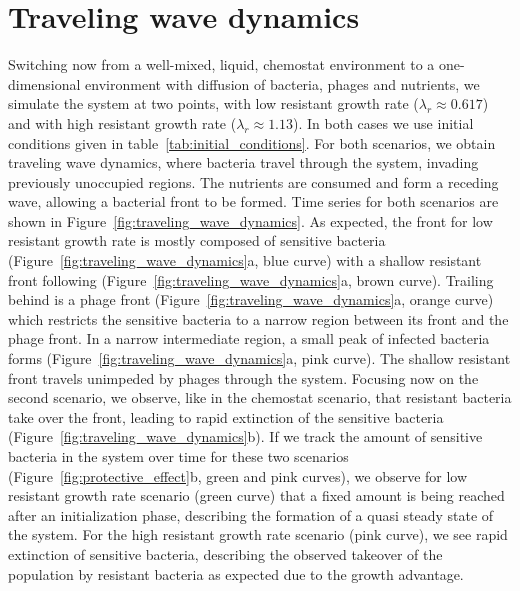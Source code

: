 \section{Traveling wave dynamics}
Switching now from a well-mixed, liquid, chemostat environment to a one-dimensional environment with diffusion of bacteria, phages and nutrients, we simulate the system at two points, with low resistant growth rate ($\lambda_r \approx 0.617$) and with high resistant growth rate ($\lambda_r \approx 1.13$). In both cases we use initial conditions given in table~\ref{tab:initial_conditions}. For both scenarios, we obtain traveling wave dynamics, where bacteria travel through the system, invading previously unoccupied regions. The nutrients are consumed and form a receding wave, allowing a bacterial front to be formed. Time series for both scenarios are shown in Figure~\ref{fig:traveling_wave_dynamics}. As expected, the front for low resistant growth rate is mostly composed of sensitive bacteria (Figure~\ref{fig:traveling_wave_dynamics}a, blue curve) with a shallow resistant front following (Figure~\ref{fig:traveling_wave_dynamics}a, brown curve). Trailing behind is a phage front (Figure~\ref{fig:traveling_wave_dynamics}a, orange curve) which restricts the sensitive bacteria to a narrow region between its front and the phage front. In a narrow intermediate region, a small peak of infected bacteria forms (Figure~\ref{fig:traveling_wave_dynamics}a, pink curve). The shallow resistant front travels unimpeded by phages through the system. Focusing now on the second scenario, we observe, like in the chemostat scenario, that resistant bacteria take over the front, leading to rapid extinction of the sensitive bacteria (Figure~\ref{fig:traveling_wave_dynamics}b). If we track the amount of sensitive bacteria in the system over time for these two scenarios (Figure~\ref{fig:protective_effect}b, green and pink curves), we observe for low resistant growth rate scenario (green curve) that a fixed amount is being reached after an initialization phase, describing the formation of a quasi steady state of the system. For the high resistant growth rate scenario (pink curve), we see rapid extinction of sensitive bacteria, describing the observed takeover of the population by resistant bacteria as expected due to the growth advantage.

